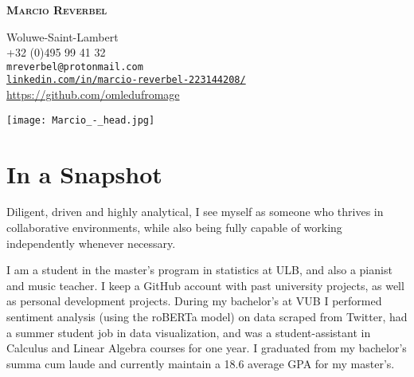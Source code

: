 \documentclass[12pt]{article}
\newcommand{\mycolor}{mySlateBlue}
\newcommand{\thesectionicon}{}
\newcommand{\sectionicon}[1]{\renewcommand{\thesectionicon}{#1}}
\begin{document}
\begin{minipage}{0.65\textwidth}
\vspace{0pt}
\begin{flushleft}
\begin{small}

  {\sffamily\bfseries\scshape\huge
    Marcio Reverbel}

\vspace{5ex}       
  \textcolor{\mycolor}{\faHome} Woluwe-Saint-Lambert\\
  \textcolor{\mycolor}{\faPhone} +32 (0)495 99 41 32\\
  \textcolor{\mycolor}{\faEnvelope} \texttt{mreverbel@protonmail.com}\\
  \textcolor{\mycolor}{\faLinkedin} \href{https://linkedin.com/in/marcio-reverbel-223144208/}{\texttt{linkedin.com/in/marcio-reverbel-223144208/}}\\
  \textcolor{\mycolor}{\faGithub} \url{https://github.com/omledufromage}\\
\end{small}
\end{flushleft}
\end{minipage}%
%
\hfill
\begin{minipage}{0.35\textwidth}
\begin{flushright}
    \texttt{[image: Marcio\_-\_head.jpg]}
    \label{img:g}
\end{flushright}
\end{minipage}

\sectionicon{\faUser}
\section{In a Snapshot}

Diligent, driven and highly analytical, I see myself as someone who thrives in collaborative environments, while also being fully capable of working independently whenever necessary. 

\vspace{1.5ex}
I am a student in the master's program in statistics at ULB, and also a pianist and music teacher. I keep a GitHub account with past university projects, as well as personal development projects. During my bachelor's at VUB I performed sentiment analysis (using the roBERTa model) on data scraped from Twitter, had a summer student job in data visualization, and was a student-assistant in Calculus and Linear Algebra courses for one year. I graduated from my bachelor's summa cum laude and currently maintain a 18.6 average GPA for my master's.
\end{document}
